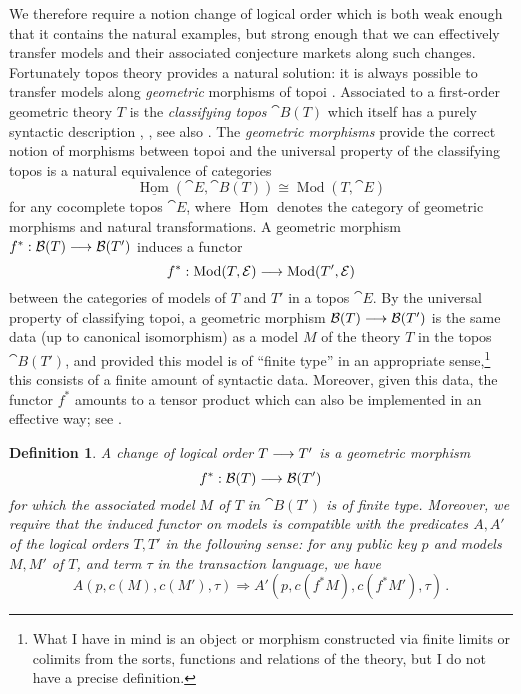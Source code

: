 \documentclass[english,letter paper,12pt,reqno]{article}
\theoremstyle{example}
\newtheorem{definition}[theorem]{Definition}
\DeclareMathOperator{\Mod}{Mod}
\begin{document}
We therefore require a notion change of logical order which is both weak enough that it contains the natural examples, but strong enough that we can effectively transfer models and their associated conjecture markets along such changes. Fortunately topos theory provides a natural solution: it is always possible to transfer models along \emph{geometric} morphisms of topoi \cite[Corollary \S X.6]{topos}. Associated to a first-order geometric theory $T$ is the \emph{classifying topos} $\cat{B}(T)$ which itself has a purely syntactic description \cite[\S D1.4]{johnstone}, \cite[Lecture 15]{risingseminar}, see also \cite[\S X.5]{topos}. The \emph{geometric morphisms} \cite[Ch. VII]{topos} provide the correct notion of morphisms between topoi and the universal property of the classifying topos \cite[\S VIII.3]{topos} is a natural equivalence of categories
\[
\underline{\operatorname{Hom}}( \cat{E}, \cat{B}(T) ) \cong \Mod(T, \cat{E})
\]
for any cocomplete topos $\cat{E}$, where $\underline{\operatorname{Hom}}$ denotes the category of geometric morphisms and natural transformations. A geometric morphism $f^*: \mathcal{B}(T) \longrightarrow \mathcal{B}(T')$ induces a functor
\[
f^*: \Mod(T, \cat{E}) \lto \Mod(T', \cat{E})
\]
between the categories of models of $T$ and $T'$ in a topos $\cat{E}$. By the universal property of classifying topoi, a geometric morphism $\mathcal{B}(T) \longrightarrow \mathcal{B}(T')$ is the same data (up to canonical isomorphism) as a model $M$ of the theory $T$ in the topos $\cat{B}(T')$, and provided this model is of ``finite type'' in an appropriate sense,\footnote{What I have in mind is an object or morphism constructed via finite limits or colimits from the sorts, functions and relations of the theory, but I do not have a precise definition.} this consists of a finite amount of syntactic data. Moreover, given this data, the functor $f^*$ amounts to a tensor product which can also be implemented in an effective way; see \cite[Lecture 12]{risingseminar}.

\begin{definition}\label{definition:change_of_order} A \emph{change of logical order} $T \longrightarrow T'$ is a geometric morphism
\[
f^*: \mathcal{B}(T) \longrightarrow \mathcal{B}(T')
\]
for which the associated model $M$ of $T$ in $\cat{B}(T')$ is of finite type. Moreover, we require that the induced functor on models is compatible with the predicates $A, A'$ of the logical orders $T,T'$ in the following sense: for any public key $p$ and models $M, M'$ of $T$, and term $\tau$ in the transaction language, we have
\begin{equation}\label{eq:preserve_transaction}
A(p, c(M), c(M'), \tau) \Longrightarrow A'(p, c(f^*M), c(f^*M'), \tau)\,.
\end{equation}
\end{definition}
\end{document}
